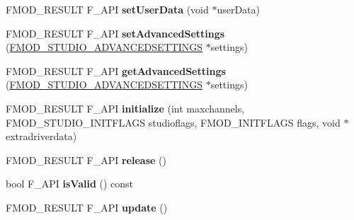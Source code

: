 \begin{DoxyCompactItemize}
\item 
\hypertarget{class_f_m_o_d_1_1_studio_1_1_system_a8afb4647f653bd1cd2b1c644caae7caa}{F\+M\+O\+D\+\_\+\+R\+E\+S\+U\+L\+T F\+\_\+\+A\+P\+I {\bfseries set\+User\+Data} (void $\ast$user\+Data)}\label{class_f_m_o_d_1_1_studio_1_1_system_a8afb4647f653bd1cd2b1c644caae7caa}

\item 
\hypertarget{class_f_m_o_d_1_1_studio_1_1_system_a4733497275af484219f80e6a55eb3796}{F\+M\+O\+D\+\_\+\+R\+E\+S\+U\+L\+T F\+\_\+\+A\+P\+I {\bfseries set\+Advanced\+Settings} (\hyperlink{struct_f_m_o_d___s_t_u_d_i_o___a_d_v_a_n_c_e_d_s_e_t_t_i_n_g_s}{F\+M\+O\+D\+\_\+\+S\+T\+U\+D\+I\+O\+\_\+\+A\+D\+V\+A\+N\+C\+E\+D\+S\+E\+T\+T\+I\+N\+G\+S} $\ast$settings)}\label{class_f_m_o_d_1_1_studio_1_1_system_a4733497275af484219f80e6a55eb3796}

\item 
\hypertarget{class_f_m_o_d_1_1_studio_1_1_system_ac0c07b7e6916d1256a5fa9ae474c8f81}{F\+M\+O\+D\+\_\+\+R\+E\+S\+U\+L\+T F\+\_\+\+A\+P\+I {\bfseries get\+Advanced\+Settings} (\hyperlink{struct_f_m_o_d___s_t_u_d_i_o___a_d_v_a_n_c_e_d_s_e_t_t_i_n_g_s}{F\+M\+O\+D\+\_\+\+S\+T\+U\+D\+I\+O\+\_\+\+A\+D\+V\+A\+N\+C\+E\+D\+S\+E\+T\+T\+I\+N\+G\+S} $\ast$settings)}\label{class_f_m_o_d_1_1_studio_1_1_system_ac0c07b7e6916d1256a5fa9ae474c8f81}

\item 
\hypertarget{class_f_m_o_d_1_1_studio_1_1_system_ad5f95bcdb0f0d762a839c9ad1a964f1c}{F\+M\+O\+D\+\_\+\+R\+E\+S\+U\+L\+T F\+\_\+\+A\+P\+I {\bfseries initialize} (int maxchannels, F\+M\+O\+D\+\_\+\+S\+T\+U\+D\+I\+O\+\_\+\+I\+N\+I\+T\+F\+L\+A\+G\+S studioflags, F\+M\+O\+D\+\_\+\+I\+N\+I\+T\+F\+L\+A\+G\+S flags, void $\ast$extradriverdata)}\label{class_f_m_o_d_1_1_studio_1_1_system_ad5f95bcdb0f0d762a839c9ad1a964f1c}

\item 
\hypertarget{class_f_m_o_d_1_1_studio_1_1_system_aa91352b2ef19bf2eb44caa98c4c5e610}{F\+M\+O\+D\+\_\+\+R\+E\+S\+U\+L\+T F\+\_\+\+A\+P\+I {\bfseries release} ()}\label{class_f_m_o_d_1_1_studio_1_1_system_aa91352b2ef19bf2eb44caa98c4c5e610}

\item 
\hypertarget{class_f_m_o_d_1_1_studio_1_1_system_acce7351e16933dd2782e4b93e1570d6a}{bool F\+\_\+\+A\+P\+I {\bfseries is\+Valid} () const }\label{class_f_m_o_d_1_1_studio_1_1_system_acce7351e16933dd2782e4b93e1570d6a}

\item 
\hypertarget{class_f_m_o_d_1_1_studio_1_1_system_a70af235a4d84807ed3840c5b8f1b1143}{F\+M\+O\+D\+\_\+\+R\+E\+S\+U\+L\+T F\+\_\+\+A\+P\+I {\bfseries update} ()}\label{class_f_m_o_d_1_1_studio_1_1_system_a70af235a4d84807ed3840c5b8f1b1143}


\end{DoxyCompactItemize}
